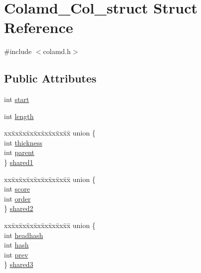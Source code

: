 \hypertarget{structColamd__Col__struct}{}\section{Colamd\+\_\+\+Col\+\_\+struct Struct Reference}
\label{structColamd__Col__struct}


{\ttfamily \#include $<$colamd.\+h$>$}

\subsection*{Public Attributes}
\begin{DoxyCompactItemize}
\item 
int \hyperlink{structColamd__Col__struct_a55c862b22c87023300b5ccb3044e0409}{start}
\item 
int \hyperlink{structColamd__Col__struct_ac61e32f7e56a6673058c0d57cb170f22}{length}
\item 
\begin{tabbing}
xx\=xx\=xx\=xx\=xx\=xx\=xx\=xx\=xx\=\kill
union \{\\
\>int \hyperlink{structColamd__Col__struct_aa52760c0c184f617d10b9946618ebc9b}{thickness}\\
\>int \hyperlink{structColamd__Col__struct_aabae0343baec2ef7f9681bf60a23bacf}{parent}\\
\} \hyperlink{structColamd__Col__struct_a49d21e821145c05e95319e8bb570a147}{shared1}\\

\end{tabbing}\item 
\begin{tabbing}
xx\=xx\=xx\=xx\=xx\=xx\=xx\=xx\=xx\=\kill
union \{\\
\>int \hyperlink{structColamd__Col__struct_aa3cc8f4e719f65ba6fead93f272d7237}{score}\\
\>int \hyperlink{structColamd__Col__struct_a22ecb292b2471f0a09316656713bfe6e}{order}\\
\} \hyperlink{structColamd__Col__struct_a3a947c21b79289ad441c72f88f3ff1d1}{shared2}\\

\end{tabbing}\item 
\begin{tabbing}
xx\=xx\=xx\=xx\=xx\=xx\=xx\=xx\=xx\=\kill
union \{\\
\>int \hyperlink{structColamd__Col__struct_a16435510e5d93025bb7b9f5715a5ba1c}{headhash}\\
\>int \hyperlink{structColamd__Col__struct_ababfe23e6edb41b345085470e52d7264}{hash}\\
\>int \hyperlink{structColamd__Col__struct_a23aaabe8f73f1ae9016ea4bb24d494a7}{prev}\\
\} \hyperlink{structColamd__Col__struct_a6f8041fbbda0ab23ffd11d0ecd78f0bf}{shared3}\\


\end{tabbing}
\end{DoxyCompactItemize}
